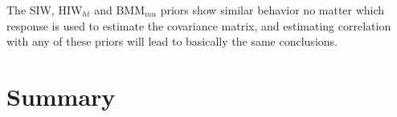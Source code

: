 \documentclass[12pt]{article}
\begin{document}
The SIW, HIW$_{ht}$ and BMM$_{mu}$ priors show similar behavior no matter which response is used to estimate the covariance matrix, and estimating correlation with any of these priors will lead to basically the same conclusions. 


\section{Summary \label{sec:summary}} 
\end{document}
